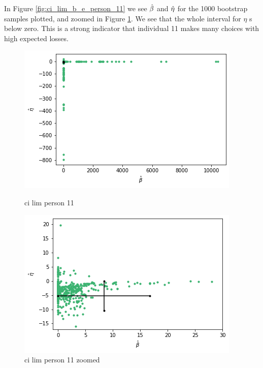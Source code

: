 In Figure \ref{fig:ci_lim_b_e_person_11} we see $\hat{\beta}$ and $\hat{\eta}$ for the 1000 bootstrap samples plotted, and zoomed in Figure \ref{fig:ci_lim_b_e_person_11_zoomed}. We see that the whole interval for $\eta$ s below zero. This is a strong indicator that individual 11 makes many choices with high expected losses. 
\begin{figure}
    \centering
    \begin{minipage}{0.48\textwidth}
        \centering
        \includegraphics[scale=0.37]{pictures/ci_lim_b_e_person11.png}
        \caption{ci lim person 11}
        \label{fig:ci_lim_b_e_person_11}
    \end{minipage}\hfill
    \begin{minipage}{0.48\textwidth}
        \centering
        \includegraphics[scale=0.37]{pictures/ci_lim_b_e_person11_zoomed.png}
        \caption{ci lim person 11 zoomed}
        \label{fig:ci_lim_b_e_person_11_zoomed}
    \end{minipage}
\end{figure}




